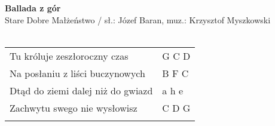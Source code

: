 \documentclass[a5paper]{article}
\begin{document}


\noindent
\fontsize{12pt}{15pt}\selectfont
\textbf{Ballada z gór} \\
\fontsize{8pt}{10pt}\selectfont
Stare Dobre Małżeństwo / sł.: Józef Baran, muz.: Krzysztof Myszkowski \\ \\
\fontsize{10pt}{12pt}\selectfont

\begin{tabular}{@{}p{8cm}p{3cm}@{}}
\noindent
Tu króluje zeszłoroczny czas & G C D \\
Na posłaniu z liści buczynowych & B F C \\
Dtąd do ziemi dalej niż do gwiazd & a h e \\
Zachwytu swego nie wysłowisz & C D G \\ \\
\end{tabular}
\end{document}
